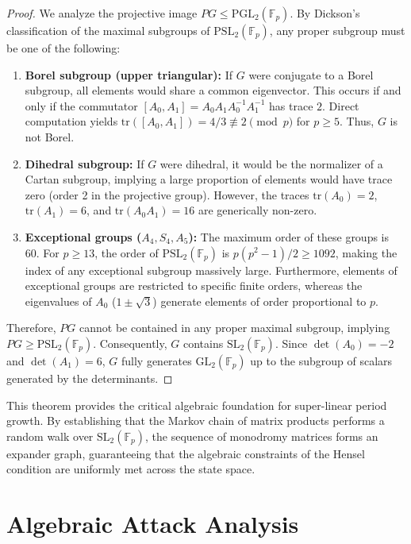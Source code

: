 \documentclass[11pt]{article}
\theoremstyle{plain}
\theoremstyle{definition}
\begin{document}
\begin{proof}
We analyze the projective image $PG \le \mathrm{PGL}_2(\mathbb{F}_p)$. By Dickson's classification of the maximal subgroups of $\mathrm{PSL}_2(\mathbb{F}_p)$, any proper subgroup must be one of the following:
\begin{enumerate}
    \item \textbf{Borel subgroup (upper triangular):} If $G$ were conjugate to a Borel subgroup, all elements would share a common eigenvector. This occurs if and only if the commutator $[A_0, A_1] = A_0 A_1 A_0^{-1} A_1^{-1}$ has trace $2$. Direct computation yields $\mathrm{tr}([A_0, A_1]) = 4/3 \not\equiv 2 \pmod p$ for $p \ge 5$. Thus, $G$ is not Borel.
    \item \textbf{Dihedral subgroup:} If $G$ were dihedral, it would be the normalizer of a Cartan subgroup, implying a large proportion of elements would have trace zero (order 2 in the projective group). However, the traces $\mathrm{tr}(A_0) = 2$, $\mathrm{tr}(A_1) = 6$, and $\mathrm{tr}(A_0 A_1) = 16$ are generically non-zero.
    \item \textbf{Exceptional groups ($A_4, S_4, A_5$):} The maximum order of these groups is 60. For $p \ge 13$, the order of $\mathrm{PSL}_2(\mathbb{F}_p)$ is $p(p^2-1)/2 \ge 1092$, making the index of any exceptional subgroup massively large. Furthermore, elements of exceptional groups are restricted to specific finite orders, whereas the eigenvalues of $A_0$ ($1 \pm \sqrt{3}$) generate elements of order proportional to $p$.
\end{enumerate}
Therefore, $PG$ cannot be contained in any proper maximal subgroup, implying $PG \ge \mathrm{PSL}_2(\mathbb{F}_p)$. Consequently, $G$ contains $\mathrm{SL}_2(\mathbb{F}_p)$. Since $\det(A_0) = -2$ and $\det(A_1) = 6$, $G$ fully generates $\mathrm{GL}_2(\mathbb{F}_p)$ up to the subgroup of scalars generated by the determinants.
\end{proof}

This theorem provides the critical algebraic foundation for super-linear period growth. By establishing that the Markov chain of matrix products performs a random walk over $\mathrm{SL}_2(\mathbb{F}_p)$, the sequence of monodromy matrices forms an expander graph, guaranteeing that the algebraic constraints of the Hensel condition are uniformly met across the state space.


\section{Algebraic Attack Analysis}
\label{sec:algebraic}
\end{document}
